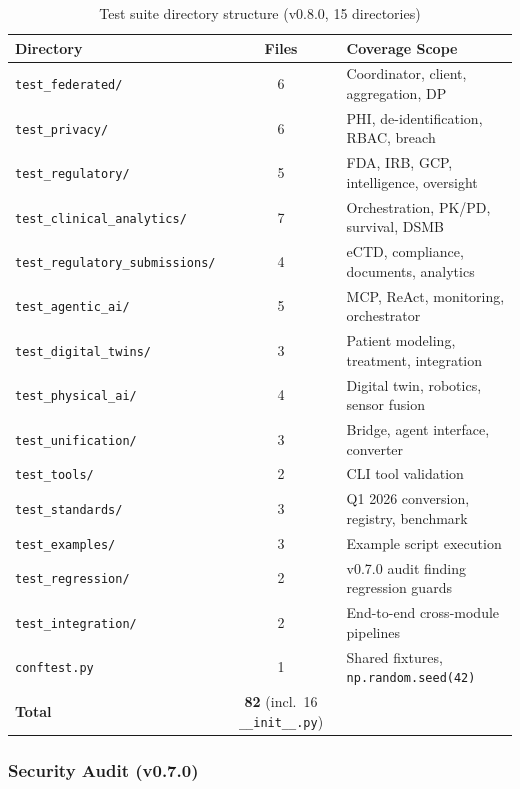 \documentclass[10pt]{article}
\begin{document}
\begin{table}[H]
\centering
\caption{Test suite directory structure (v0.8.0, 15 directories)}
\label{tab:tests}
\small
\begin{tabular}{@{}lcp{4.5cm}@{}}
\toprule
\textbf{Directory} & \textbf{Files} & \textbf{Coverage Scope} \\
\midrule
\texttt{test\_federated/} & 6 & Coordinator, client, aggregation, DP \\
\texttt{test\_privacy/} & 6 & PHI, de-identification, RBAC, breach \\
\texttt{test\_regulatory/} & 5 & FDA, IRB, GCP, intelligence, oversight \\
\texttt{test\_clinical\_analytics/} & 7 & Orchestration, PK/PD, survival, DSMB \\
\texttt{test\_regulatory\_submissions/} & 4 & eCTD, compliance, documents, analytics \\
\texttt{test\_agentic\_ai/} & 5 & MCP, ReAct, monitoring, orchestrator \\
\texttt{test\_digital\_twins/} & 3 & Patient modeling, treatment, integration \\
\texttt{test\_physical\_ai/} & 4 & Digital twin, robotics, sensor fusion \\
\texttt{test\_unification/} & 3 & Bridge, agent interface, converter \\
\texttt{test\_tools/} & 2 & CLI tool validation \\
\texttt{test\_standards/} & 3 & Q1 2026 conversion, registry, benchmark \\
\texttt{test\_examples/} & 3 & Example script execution \\
\texttt{test\_regression/} & 2 & v0.7.0 audit finding regression guards \\
\texttt{test\_integration/} & 2 & End-to-end cross-module pipelines \\
\texttt{conftest.py} & 1 & Shared fixtures, \texttt{np.random.seed(42)} \\
\midrule
\textbf{Total} & \textbf{82} (incl.\ 16 \texttt{\_\_init\_\_.py}) & \\
\bottomrule
\end{tabular}
\end{table}

\subsubsection{Security Audit (v0.7.0)}
\end{document}
